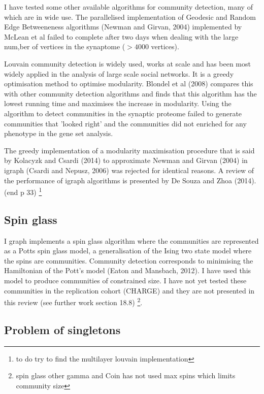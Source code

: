 I have tested some other available algorithms for community detection, many of which are in wide use. The parallelised implementation of Geodesic and Random Edge Betweeneness algorithms (Newman and Girvan, 2004) implemented by McLean et al failed to complete after two days when dealing with the large num,ber of vertices in the synaptome ($>4000$ vertices).\cite{mclean2016improved}

Louvain \cite{blondel2008fast} community detection is widely used, works at scale and has been most widely applied in the analysis of large scale social networks. It is a greedy optimisation method to optimise modularity. 
Blondel et al (2008) compares this with other community detection algorithms and finds that this algorithm has the lowest running time and maximises the increase in modularity.
Using the algorithm to detect communities in the synaptic proteome failed to generate communities that 'looked right' and the communities did not enriched for any phenotype in the gene set analysis.

The greedy implementation of a modularity maximisation procedure that is said by Kolacyzk and Csardi (2014) to approximate Newman and Girvan (2004) in igraph (Csardi and Nepusz, 2006) was rejected for identical reasons. A review of the performance of igraph algorithms is presented by De Souza and Zhoa (2014). (end p 33) \footnote{to do try to find the multilayer louvain implementation}

\subsection{Spin glass}

I graph implements a spin glass algorithm where the communities are represented as a Potts spin glass model, a generalisation of the Ising two state model where the spins are communities. Community detection corresponds to minimising the Hamiltonian of the Pott's model (Eaton and Mansbach, 2012). I have used this model to produce communities of constrained size. I have not yet tested these communities in the replication cohort (CHARGE) and they are not presented in this review (see further work section 18.8) \footnote{spin glass other gamma and Coin has not used max spins which limits community size}.

\subsection{Problem of singletons}

